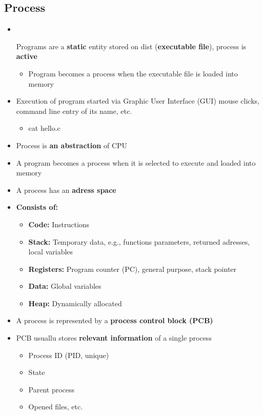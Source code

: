 \documentclass[a4paper,11pt,english]{article}
\begin{document}
\subsection*{Process}
\begin{itemize}
    \item {Programs are a \textbf{\color{blue}static} entity stored on dist (\textbf{\color{blue}executable file}), process is \textbf{\color{blue}active}
            \begin{itemize}
                \item Program becomes a process when the executable file is loaded into memory
            \end{itemize}
        }
    \item {Execution of program started via Graphic User Interface (GUI) mouse clicks, command line entry of its name, etc.
            \begin{itemize}
                \item cat hello.c 
            \end{itemize}
        }
    \item Process is \textbf{\color{blue}an abstraction} of CPU

    \item A program becomes a process when it is selected to execute and loaded into memory
    \item A process has an \textbf{\color{blue}adress space}

    \item \textbf{Consists of:}
        \begin{itemize}
            \item \textbf{\color{blue!60!white}Code:} Instructions
            \item \textbf{\color{blue!60!white}Stack:} Temporary data, e.g., functions parameters, returned adresses, local variables
            \item \textbf{\color{blue!60!white}Registers:} Program counter (PC), general purpose, stack pointer
            \item \textbf{\color{blue!60!white}Data:} Global variables
            \item \textbf{\color{blue!60!white}Heap:} Dynamically allocated
        \end{itemize}
    \item A process is represented by a \textbf{\color{blue}process control block (PCB)}
    \item PCB usuallu stores \textbf{\color{blue}relevant information} of a single process
        \begin{itemize}
            \item Process ID (PID, unique)
            \item State
            \item Parent process
            \item Opened files, etc.
        \end{itemize}
\end{itemize}
\end{document}
